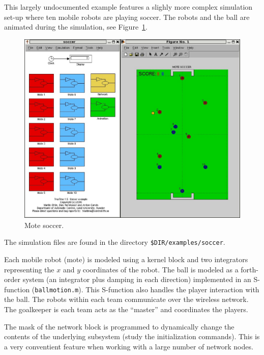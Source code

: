 \documentclass[final,twoside]{rapport}
\begin{document}
This largely undocumented example features a slighly more complex
simulation set-up where ten mobile robots are playing soccer. The
robots and the ball are animated during the simulation, see
Figure~\ref{fig:soccer}. 
\begin{figure}
  \centerline{\includegraphics[width=0.9\hsize]{soccer.ps}}
  \caption{Mote soccer.}
  \label{fig:soccer}
\end{figure}
The simulation files are found in the directory
\texttt{\$DIR/examples/soccer}.

Each mobile robot (mote) is modeled using a kernel block and two
integrators representing the $x$ and $y$ coordinates of the robot. The
ball is modeled as a forth-order system (an integrator plus damping in
each direction) implemented in an S-function ({\tt ballmotion.m}).
This S-function also handles the player interaction with the ball. The
robots within each team communicate over the wireless network. The
goalkeeper is each team acts as the ``master'' and coordinates the
players. 

The mask of the network block is programmed to dynamically change the
contents of the underlying subsystem (study the initialization
commands). This is a very conventient feature when working with a
large number of network nodes.


\end{document}
